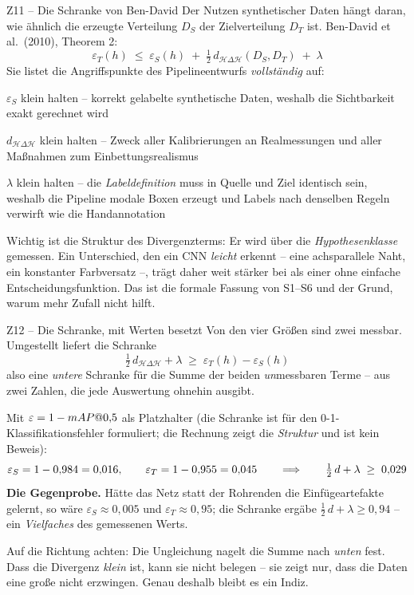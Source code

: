 \documentclass[14pt,aspectratio=169]{beamer}
\begin{document}
\begin{frame}{Z11 -- Die Schranke von Ben-David}
\zusatzdicht
Der Nutzen synthetischer Daten hängt daran, wie ähnlich die erzeugte
Verteilung $D_S$ der Zielverteilung $D_T$ ist. Ben-David et al.\ (2010),
Theorem 2:
\[\varepsilon_T(h) \;\leq\; \varepsilon_S(h)
  \;+\; \tfrac12\, d_{\mathcal{H}\Delta\mathcal{H}}(D_S,D_T) \;+\; \lambda\]
Sie listet die Angriffspunkte des Pipelineentwurfs \emph{vollständig} auf:
\begin{punkte}[0.25em]
  \item $\varepsilon_S$ klein halten -- korrekt gelabelte synthetische Daten,
        weshalb die Sichtbarkeit exakt gerechnet wird
  \item $d_{\mathcal{H}\Delta\mathcal{H}}$ klein halten -- Zweck aller
        Kalibrierungen an Realmessungen und aller Maßnahmen zum
        Einbettungsrealismus
  \item $\lambda$ klein halten -- die \emph{Labeldefinition} muss in Quelle
        und Ziel identisch sein, weshalb die Pipeline modale Boxen erzeugt
        und Labels nach denselben Regeln verwirft wie die Handannotation
\end{punkte}
\smallskip
{\color{akzent}Wichtig ist die Struktur des Divergenzterms: Er wird über die
\emph{Hypothesenklasse} gemessen. Ein Unterschied, den ein CNN \emph{leicht}
erkennt -- eine achsparallele Naht, ein konstanter Farbversatz --, trägt
daher weit stärker bei als einer ohne einfache Entscheidungsfunktion. Das ist
die formale Fassung von S1--S6 und der Grund, warum mehr Zufall nicht hilft.}
\end{frame}

\begin{frame}{Z12 -- Die Schranke, mit Werten besetzt}
\zusatzdicht
Von den vier Größen sind zwei messbar. Umgestellt liefert die Schranke
\[\tfrac12\, d_{\mathcal{H}\Delta\mathcal{H}} + \lambda \;\geq\;
  \varepsilon_T(h) - \varepsilon_S(h)\]
also eine \emph{untere} Schranke für die Summe der beiden \emph{un}messbaren
Terme -- aus zwei Zahlen, die jede Auswertung ohnehin ausgibt.
\smallskip

Mit $\varepsilon = 1 - mAP@0{,}5$ als Platzhalter (die Schranke ist für den
0-1-Klassifikationsfehler formuliert; die Rechnung zeigt die \emph{Struktur}
und ist kein Beweis):
\[\varepsilon_S = 1 - 0{,}984 = 0{,}016, \qquad
  \varepsilon_T = 1 - 0{,}955 = 0{,}045
  \qquad\Longrightarrow\qquad \tfrac12\, d + \lambda \;\geq\; 0{,}029\]
\textbf{Die Gegenprobe.} Hätte das Netz statt der Rohrenden die
Einfügeartefakte gelernt, so wäre $\varepsilon_S \approx 0{,}005$ und
$\varepsilon_T \approx 0{,}95$; die Schranke ergäbe
$\tfrac12\, d + \lambda \geq 0{,}94$ -- ein \emph{Vielfaches} des gemessenen Werts.
\smallskip

{\color{warn}Auf die Richtung achten:} Die Ungleichung nagelt die Summe nach
\emph{unten} fest. Dass die Divergenz \emph{klein} ist, kann sie nicht
belegen -- sie zeigt nur, dass die Daten eine große nicht erzwingen. Genau
deshalb bleibt es ein Indiz.
\end{frame}
\end{document}
